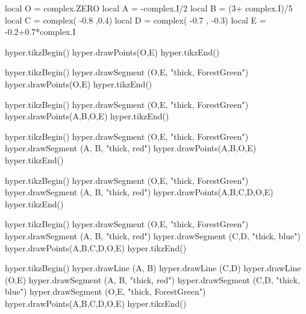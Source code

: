 \documentclass[margin=.2cm,multi,tikz]{standalone}
\begin{document}
\begin{luacode*}
local O = complex.ZERO
local A = -complex.I/2
local B = (3+ complex.I)/5
local C = complex( -0.8 ,0.4)
local D = complex( -0.7 , -0.3)
local E = -0.2+0.7*complex.I

hyper.tikzBegin()
hyper.drawPoints(O,E)
hyper.tikzEnd()

hyper.tikzBegin()
hyper.drawSegment (O,E, "thick, ForestGreen")
hyper.drawPoints(O,E)
hyper.tikzEnd()

hyper.tikzBegin()
hyper.drawSegment (O,E, "thick, ForestGreen")
hyper.drawPoints(A,B,O,E)
hyper.tikzEnd()

hyper.tikzBegin()
hyper.drawSegment (O,E, "thick, ForestGreen")
hyper.drawSegment (A, B, "thick, red")
hyper.drawPoints(A,B,O,E)
hyper.tikzEnd()

hyper.tikzBegin()
hyper.drawSegment (O,E, "thick, ForestGreen")
hyper.drawSegment (A, B, "thick, red")
hyper.drawPoints(A,B,C,D,O,E)
hyper.tikzEnd()

hyper.tikzBegin()
hyper.drawSegment (O,E, "thick, ForestGreen")
hyper.drawSegment (A, B, "thick, red")
hyper.drawSegment (C,D, "thick, blue")
hyper.drawPoints(A,B,C,D,O,E)
hyper.tikzEnd()

hyper.tikzBegin()
hyper.drawLine (A, B)
hyper.drawLine (C,D)
hyper.drawLine (O,E)
hyper.drawSegment (A, B, "thick, red")
hyper.drawSegment (C,D, "thick, blue")
hyper.drawSegment (O,E, "thick, ForestGreen")
hyper.drawPoints(A,B,C,D,O,E)
hyper.tikzEnd()

\end{luacode*}
\end{document}
